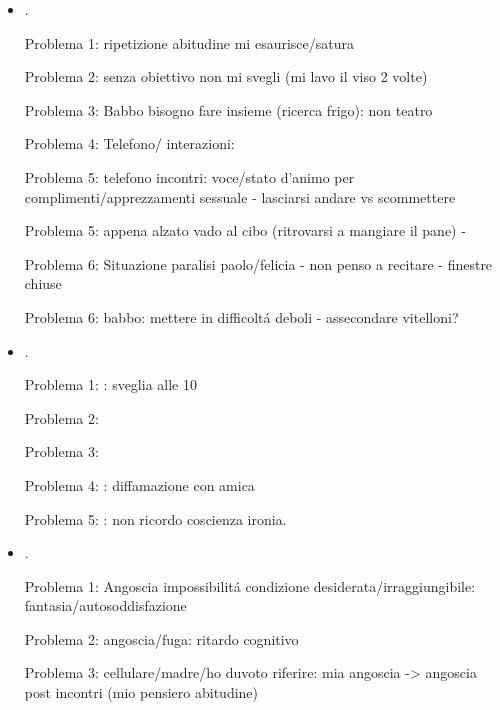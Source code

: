 \begin{itemize}
Problema 5: Per obiettivo me lascio risorse misere

Problema 6: Cosa \'e questo sonno imprescindibile?


\item {}.

Problema 1: ripetizione abitudine mi esaurisce/satura

Problema 2: senza obiettivo non mi svegli (mi lavo il viso 2 volte)

Problema 3: Babbo bisogno fare insieme (ricerca frigo): non teatro

Problema 4: Telefono/ interazioni: 

Problema 5: telefono incontri: voce/stato d'animo per complimenti/apprezzamenti sessuale - lasciarsi andare vs scommettere

Problema 5: appena alzato vado al cibo (ritrovarsi a mangiare il pane) - 

Problema 6: Situazione paralisi paolo/felicia - non penso a recitare - finestre chiuse 

Problema 6: babbo: mettere in difficolt\'a deboli - assecondare vitelloni?

\item {}.

Problema 1: : sveglia alle 10

Problema 2: 

Problema 3: 

Problema 4: : diffamazione con amica

Problema 5: : non ricordo coscienza ironia. 

\item {}.

Problema 1: Angoscia impossibilit\'a condizione desiderata/irraggiungibile: fantasia/autosoddisfazione

Problema 2: angoscia/fuga: ritardo cognitivo 

Problema 3: cellulare/madre/ho duvoto riferire: mia angoscia -> angoscia post incontri (mio pensiero abitudine) 



\end{itemize}
